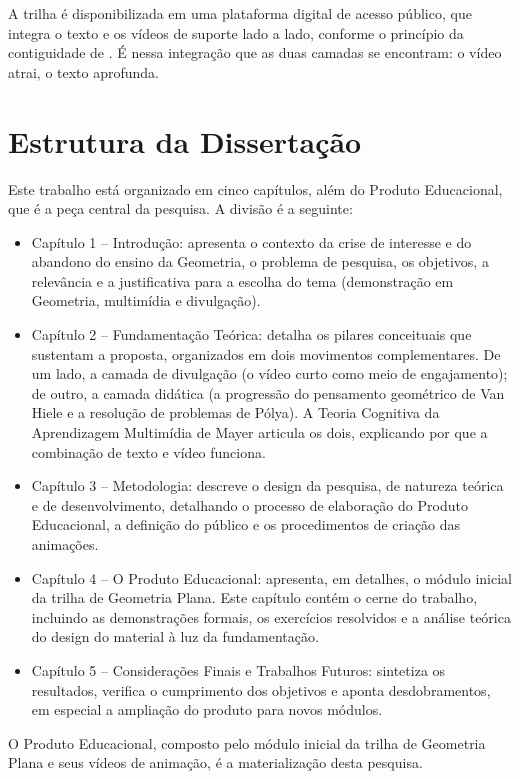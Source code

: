 A trilha é disponibilizada em uma plataforma digital de acesso público, que integra o texto e os vídeos de suporte lado a lado, conforme o princípio da contiguidade de . É nessa integração que as duas camadas se encontram: o vídeo atrai, o texto aprofunda.



\section{Estrutura da Dissertação}
Este trabalho está organizado em cinco capítulos, além do Produto Educacional, que é a peça central da pesquisa. A divisão é a seguinte:

\begin{itemize}
    \item Capítulo 1 – Introdução: apresenta o contexto da crise de interesse e do abandono do ensino da Geometria, o problema de pesquisa, os objetivos, a relevância e a justificativa para a escolha do tema (demonstração em Geometria, multimídia e divulgação).
    \item Capítulo 2 – Fundamentação Teórica: detalha os pilares conceituais que sustentam a proposta, organizados em dois movimentos complementares. De um lado, a camada de divulgação (o vídeo curto como meio de engajamento); de outro, a camada didática (a progressão do pensamento geométrico de Van Hiele e a resolução de problemas de Pólya). A Teoria Cognitiva da Aprendizagem Multimídia de Mayer articula os dois, explicando por que a combinação de texto e vídeo funciona.
    \item Capítulo 3 – Metodologia: descreve o design da pesquisa, de natureza teórica e de desenvolvimento, detalhando o processo de elaboração do Produto Educacional, a definição do público e os procedimentos de criação das animações.
    \item Capítulo 4 – O Produto Educacional: apresenta, em detalhes, o módulo inicial da trilha de Geometria Plana. Este capítulo contém o cerne do trabalho, incluindo as demonstrações formais, os exercícios resolvidos e a análise teórica do design do material à luz da fundamentação.
    \item Capítulo 5 – Considerações Finais e Trabalhos Futuros: sintetiza os resultados, verifica o cumprimento dos objetivos e aponta desdobramentos, em especial a ampliação do produto para novos módulos.
\end{itemize}

O Produto Educacional, composto pelo módulo inicial da trilha de Geometria Plana e seus vídeos de animação, é a materialização desta pesquisa.
